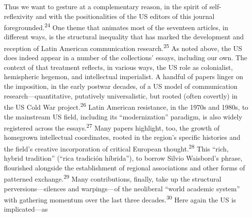 \documentclass{tufte-handout}
\begin{document}
Thus we want to gesture at a complementary reason, in the spirit of
self-reflexivity and with the positionalities of the US editors of this
journal foregrounded.\textsuperscript{24} One theme that animates most of the seventeen
articles, in different ways, is the structural inequality that has
marked the development and reception of Latin American communication
research.\textsuperscript{25}
As noted above, the US does indeed appear in a number of the
collections' essays, including our own. The context of that treatment
reflects, in various ways, the US role as colonialist, hemispheric
hegemon, and intellectual imperialist. A handful of papers linger on the
imposition, in the early postwar decades, of a US model of communication
research---quantitative, putatively universalistic, but rooted (often
covertly) in the US Cold War project.\textsuperscript{26} Latin American resistance, in
the 1970s and 1980s, to the mainstream US field, including its
``modernization'' paradigm, is also widely registered across the
essays.\textsuperscript{27} Many papers highlight, too, the
growth of homegrown intellectual coordinates, rooted in the region's
specific histories and the field's creative incorporation of critical
European thought.\textsuperscript{28} This ``rich, hybrid tradition'' (``rica
tradición híbrida''), to borrow Silvio Waisbord's phrase, flourished
alongside the establishment of regional associations and other forms of
patterned exchange.\textsuperscript{29}
Many contributions, finally, take up the structural
perversions---silences and warpings---of the neoliberal ``world academic
system'' with gathering momentum over the last three decades.\textsuperscript{30} Here again the US is implicated---as
\end{document}
